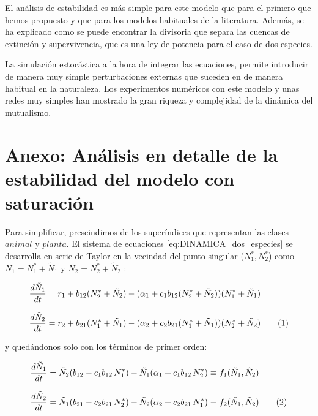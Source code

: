 El análisis de estabilidad es más simple para este modelo que para el primero que hemos propuesto y que para los modelos habituales de la literatura. Además, se ha explicado como se puede encontrar la divisoria que separa las cuencas de extinción y supervivencia, que es una ley de potencia para el caso de dos especies.

La simulación estocástica a la hora de integrar las ecuaciones, permite introducir de manera muy simple perturbaciones externas que suceden en de manera habitual en la naturaleza. Los experimentos numéricos con este modelo y unas redes muy simples han mostrado la gran riqueza y complejidad de la dinámica del mutualismo.

\section{Anexo: Análisis en detalle de la estabilidad del modelo con saturación}
\label{DINAMICA_ANEXO_estabilidad}

Para simplificar, prescindimos de los superíndices que representan las clases $animal$ y $planta$. 
El sistema de ecuaciones \ref{eq:DINAMICA_dos_especies} se desarrolla en serie de Taylor en la vecindad del punto singular ($N^{*}_{1}, N^{*}_{2}$) como  $N_{1}= N^{*}_1+\tilde{N}_{1}$ y $N_{2}= N^{*}_2+\tilde{N}_{2}$ \cite{murray1993mathematical}:

\begin{equation}
\begin{array}{lcr}
\displaystyle \frac{d\tilde{N}_{1}}{dt} = r_{1}+ b_{12}(N^{*}_2+\tilde{N}_{2})-(\alpha_{1}+ c_{1} b_{12} (N^{*}_2+\tilde{N}_{2}))( N^{*}_1+\tilde{N}_{1})\nonumber\\
\\
\displaystyle \frac{d\tilde{N}_{2}}{dt} = r_{2}+ b_{21}( N^{*}_1+\tilde{N}_{1})-(\alpha_{2}+ c_{2} b_{21}(N^{*}_1+\tilde{N}_{1}))(N^{*}_2+\tilde{N}_{2}) 
\stepcounter{equation}\tag{\theequation}\label{eq:effrateTaylor}
\end{array}
\end{equation}

\noindent y quedándonos solo con los términos de primer orden:

\begin{equation}
\begin{array}{lcr}
\displaystyle \frac{d\tilde{N}_{1}}{dt}= \tilde{N}_{2}( b_{12} - c_{1} b_{12}\, N^{*}_1)-\tilde{N}_{1}(\alpha_{1}+ c_{1} b_{12} \, N^{*}_2) \equiv f_{1}(\tilde{N}_{1},\tilde{N}_{2}) \nonumber\\
\\
\displaystyle \frac{d\tilde{N}_{2}}{dt} = \tilde{N}_{1}( b_{21} - c_{2} b_{21}\, N^{*}_2)-\tilde{N}_{2}(\alpha_{2}+ c_{2} b_{21} \, N^{*}_1) \equiv f_{2}(\tilde{N}_{1},\tilde{N}_{2})
\stepcounter{equation}\tag{\theequation}\label{eq:effrateTaylor2}
\end{array}
\end{equation}

